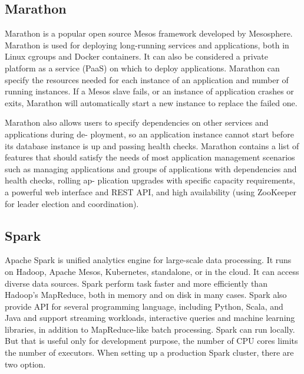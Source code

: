 \documentclass[12pt,oneside,openright,a4paper]{cpe-english-project}
\begin{document}
\subsection{Marathon}

\hspace{10mm}Marathon is a popular open source Mesos framework developed by Mesosphere. Marathon is used for deploying long-running services and applications, both in Linux cgroups and Docker containers. It can also be considered a private platform as a service (PaaS) on which to deploy applications. Marathon can specify the resources needed for each instance of an application and number of running instances. If a Mesos slave fails, or an instance of application crashes or exits, Marathon will automatically start a new instance to replace the failed one.

\hspace{10mm}Marathon also allows users to specify dependencies on other services and applications during de- ployment, so an application instance cannot start before its database instance is up and passing health checks. Marathon contains a list of features that should satisfy the needs of most application management scenarios such as managing applications and groups of applications with dependencies and health checks, rolling ap- plication upgrades with specific capacity requirements, a powerful web interface and REST API, and high availability (using ZooKeeper for leader election and coordination).\cite{mesosInAction}

\subsection{Spark}

\hspace{10mm}Apache Spark is unified analytics engine for large-scale data processing. It runs on Hadoop, Apache Mesos, Kubernetes, standalone, or in the cloud. It can access diverse data sources. Spark perform task faster and more efficiently than Hadoop’s MapReduce, both in memory and on disk in many cases. Spark also provide API for several programming language, including Python, Scala, and Java and support streaming workloads, interactive queries and machine learning libraries, in addition to MapReduce-like batch processing.  Spark can run locally. But that is useful only for development purpose, the number of CPU cores limits the number of executors. When setting up a production Spark cluster, there are two option.
\end{document}
